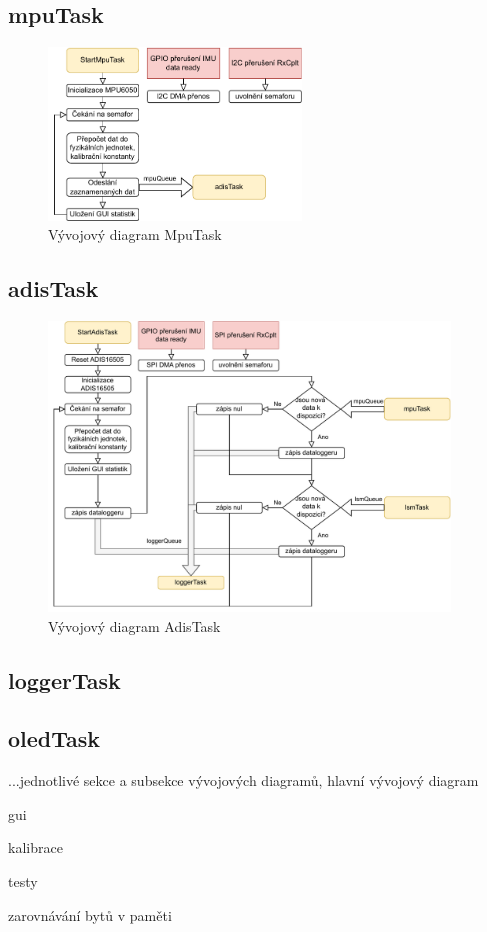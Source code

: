 \subsection{mpuTask}
\begin{figure}[h]
    \centering
    \includegraphics[width=0.6\textwidth]{obrazky/MpuTask}
    \caption{Vývojový diagram MpuTask}
\end{figure}
\subsection{adisTask}
\begin{figure}[h]
    \centering
    \includegraphics[width=0.95\textwidth]{obrazky/AdisTask}
    \caption{Vývojový diagram AdisTask}
\end{figure}
\subsection{loggerTask}
\subsection{oledTask}

...jednotlivé sekce a subsekce vývojových diagramů, hlavní vývojový diagram

gui

kalibrace

testy

zarovnávání bytů v paměti



